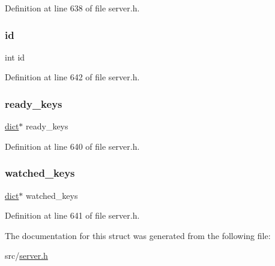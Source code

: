 Definition at line 638 of file server.\+h.

\mbox{\label{structredis_db_a7441ef0865bcb3db9b8064dd7375c1ea}} 
\subsubsection{\texorpdfstring{id}{id}}
{\footnotesize\ttfamily int id}



Definition at line 642 of file server.\+h.

\mbox{\label{structredis_db_a06ae0ac6a04c866ce83ece29d9a44073}} 
\subsubsection{\texorpdfstring{ready\+\_\+keys}{ready\_keys}}
{\footnotesize\ttfamily \hyperlink{structdict}{dict}$\ast$ ready\+\_\+keys}



Definition at line 640 of file server.\+h.

\mbox{\label{structredis_db_acf93a40c69ba9e3938f50aa3b1087abc}} 
\subsubsection{\texorpdfstring{watched\+\_\+keys}{watched\_keys}}
{\footnotesize\ttfamily \hyperlink{structdict}{dict}$\ast$ watched\+\_\+keys}



Definition at line 641 of file server.\+h.



The documentation for this struct was generated from the following file\+:\begin{DoxyCompactItemize}
\item 
src/\hyperlink{server_8h}{server.\+h}\end{DoxyCompactItemize}
